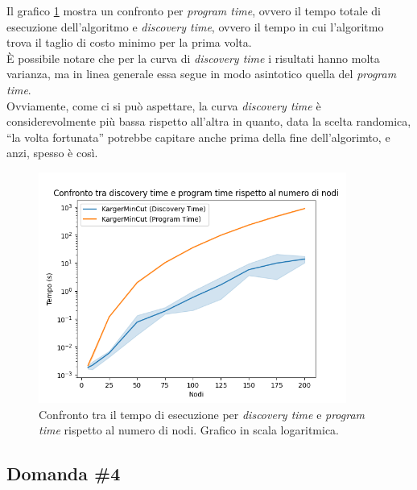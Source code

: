 \noindent Il grafico \ref{fig:karger-discovery-vs-program-time-chart}
mostra un confronto per \emph{program time}, ovvero il tempo totale di
esecuzione dell'algoritmo e \emph{discovery time}, ovvero il tempo in
cui l'algoritmo trova il taglio di costo minimo per la prima volta.\\

\noindent È possibile notare che per la curva di \emph{discovery time}
i risultati hanno molta varianza, ma in linea generale essa segue in
modo asintotico quella del \emph{program time}.\\

\noindent Ovviamente, come ci si può aspettare, la curva
\emph{discovery time} è considerevolmente più bassa rispetto all'altra
in quanto, data la scelta randomica, ``la volta fortunata'' potrebbe
capitare anche prima della fine dell'algorimto, e anzi, spesso è così.

\begin{figure}[H]
    \centering

    \includegraphics[width=0.9\textwidth]{./images/Confronto_tra_discovery_time_e_program_time_rispetto_al_numero_di_nodi.png}

    \caption{Confronto tra il tempo di esecuzione per \emph{discovery time} e \emph{program time} rispetto al numero di nodi. Grafico in scala logaritmica.}
    \label{fig:karger-discovery-vs-program-time-chart}
\end{figure}

\subsection{Domanda \#4}
\label{sec:question-4}


